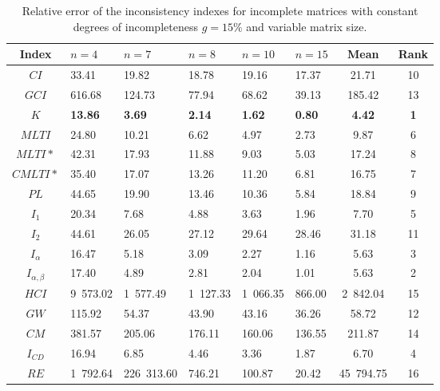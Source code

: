 \begin{table}[ht]
\begin{center}
\caption{Relative error of the inconsistency indexes for incomplete matrices with constant degrees of incompleteness $g=15\%$ and variable matrix size.}
\label{tab:results1}
\begin{tabular}{|c||l|l|l|l|l||c|c|}
\hline Index & $n = 4$ & $n = 7$ & $n = 8$ & $n = 10$ & $n = 15$ & Mean & Rank \\ \hline \hline
$CI$ & 33.41 & 19.82 & 18.78 & 19.16 & 17.37 & 21.71 & 10 \\ \hline
$GCI$ & 616.68 & 124.73 & 77.94 & 68.62 & 39.13 & 185.42 & 13 \\ \hline
$K$ & \textbf{13.86} & \textbf{3.69} & \textbf{2.14} & \textbf{1.62} & \textbf{0.80} & \textbf{4.42} & \textbf{1} \\ \hline
$MLTI$ & 24.80 & 10.21 & 6.62 & 4.97 & 2.73 & 9.87 & 6 \\ \hline
$MLTI*$ & 42.31 & 17.93 & 11.88 & 9.03 & 5.03 & 17.24 & 8 \\ \hline
$CMLTI*$ & 35.40 & 17.07 & 13.26 & 11.20 & 6.81 & 16.75 & 7 \\ \hline
$PL$ & 44.65 & 19.90 & 13.46 & 10.36 & 5.84 & 18.84 & 9 \\ \hline
$I_1$ & 20.34 & 7.68 & 4.88 & 3.63 & 1.96 & 7.70 & 5 \\ \hline
$I_2$ & 44.61 & 26.05 & 27.12 & 29.64 & 28.46 & 31.18 & 11 \\ \hline
$I_{\alpha}$ & 16.47 & 5.18 & 3.09 & 2.27 & 1.16 & 5.63 & 3 \\ \hline
$I_{\alpha,\beta}$ & 17.40 & 4.89 & 2.81 & 2.04 & 1.01 & 5.63 & 2 \\ \hline
$HCI$ & 9 573.02 & 1 577.49 & 1 127.33 & 1 066.35 & 866.00 & 2 842.04 & 15 \\ \hline
$GW$ & 115.92 & 54.37 & 43.90 & 43.16 & 36.26 & 58.72 & 12 \\ \hline
$CM$ & 381.57 & 205.06 & 176.11 & 160.06 & 136.55 & 211.87 & 14 \\ \hline
$I_{CD}$ & 16.94 & 6.85 & 4.46 & 3.36 & 1.87 & 6.70 & 4 \\ \hline
$RE$ & 1 792.64 & 226 313.60 & 746.21 & 100.87 & 20.42 & 45 794.75 & 16 \\ \hline
\end{tabular}
\end{center}
\end{table}

